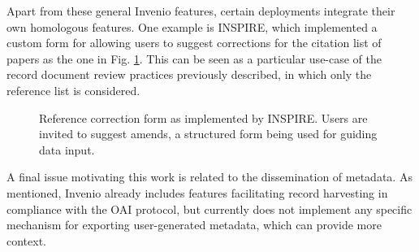 Apart from these general Invenio features, certain deployments integrate their
own homologous features. One example is INSPIRE, which implemented a custom
form for allowing users to suggest corrections for the citation list of papers
as the one in Fig. \ref{fig:inspire}. This can be seen as a particular use-case
of the record document review practices previously described, in which only the
reference list is considered.

\begin{figure}[!ht]
  \centering
  \caption[Reference correction form as implemented by INSPIRE.]
          {Reference correction form as implemented by INSPIRE. Users are
           invited to suggest amends, a structured form being used for guiding
           data input.}
  \label{fig:inspire}
\end{figure}

A final issue motivating this work is related to the dissemination of metadata.
As mentioned, Invenio already includes features facilitating record harvesting
in compliance with the OAI protocol, but currently does not implement any
specific mechanism for exporting user-generated metadata, which can provide
more context.
